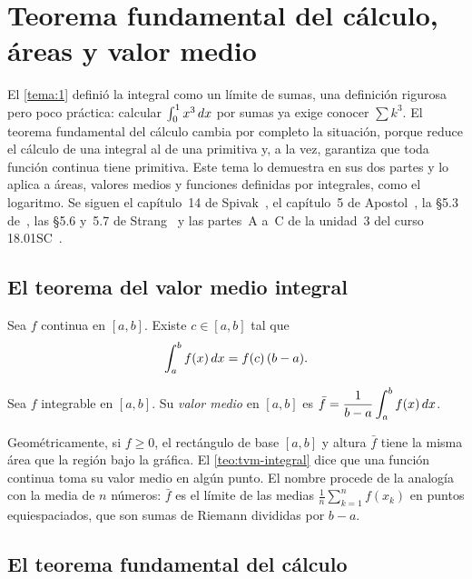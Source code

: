 \chapter{Teorema fundamental del cálculo, áreas y valor medio}
\label{tema:2}

El \cref{tema:1} definió la integral como un límite de sumas, una definición rigurosa pero poco práctica: calcular $\int_0^1x^{3}\mathop{}\!d x$ por sumas ya exige conocer $\sum k^{3}$. El teorema fundamental del cálculo cambia por completo la situación, porque reduce el cálculo de una integral al de una primitiva y, a la vez, garantiza que toda función continua tiene primitiva. Este tema lo demuestra en sus dos partes y lo aplica a áreas, valores medios y funciones definidas por integrales, como el logaritmo. Se siguen el capítulo~14 de Spivak~\cite{spivak}, el capítulo~5 de Apostol~\cite{apostol}, la §5.3 de~\cite{openstax1}, las §5.6 y~5.7 de Strang~\cite{strang} y las partes~A a~C de la unidad~3 del curso 18.01SC~\cite{mit1801}.

\section{El teorema del valor medio integral}

\begin{teorema}\label{teo:tvm-integral}
Sea $f$ continua en $[a,b]$. Existe $c\in[a,b]$ tal que
\[
\int_a^b f(x)\mathop{}\!d x=f(c)\,(b-a).
\]
\end{teorema}

\begin{definicion}\label{def:valor-medio}
Sea $f$ integrable en $[a,b]$. Su \emph{valor medio} en $[a,b]$ es
$\displaystyle\bar f=\frac{1}{b-a}\int_a^b f(x)\mathop{}\!d x$.
\end{definicion}

Geométricamente, si $f\ge0$, el rectángulo de base $[a,b]$ y altura $\bar f$ tiene la misma área que la región bajo la gráfica. El \cref{teo:tvm-integral} dice que una función continua toma su valor medio en algún punto. El nombre procede de la analogía con la media de $n$ números: $\bar f$ es el límite de las medias $\frac1n\sum_{k=1}^{n}f(x_k)$ en puntos equiespaciados, que son sumas de Riemann divididas por $b-a$.

\section{El teorema fundamental del cálculo}

